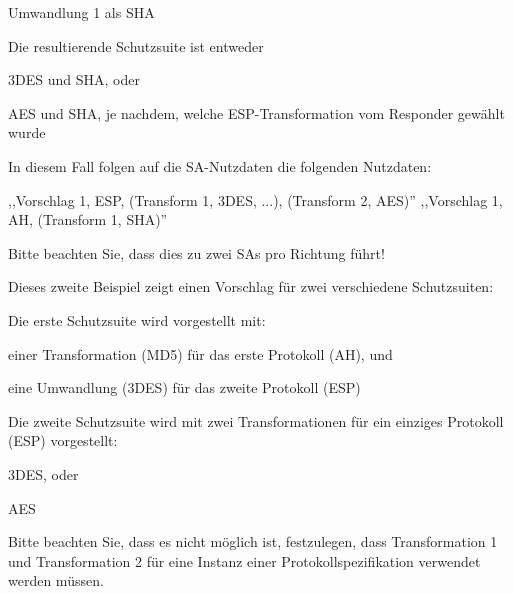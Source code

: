 \documentclass[a4paper]{article}
\begin{document}
\begin{multicols}{3}
\begin{itemize*}
\begin{itemize*}
                  \begin{itemize*}
                        \item Umwandlung 1 als SHA
                  \end{itemize*}
                  \item Die resultierende Schutzsuite ist entweder
                  \begin{itemize*}
                        \item 3DES und SHA, oder
                        \item AES und SHA, je nachdem, welche ESP-Transformation vom Responder gewählt wurde
                  \end{itemize*}
                  \item In diesem Fall folgen auf die SA-Nutzdaten die folgenden Nutzdaten:
                  \begin{itemize*}
                        \item ,,Vorschlag 1, ESP, (Transform 1, 3DES, ...), (Transform 2, AES)'' ,,Vorschlag 1, AH, (Transform 1, SHA)''
                  \end{itemize*}
                  \item Bitte beachten Sie, dass dies zu zwei SAs pro Richtung führt!
            \end{itemize*}
            \item Dieses zweite Beispiel zeigt einen Vorschlag für zwei verschiedene
            Schutzsuiten:
            \begin{itemize*}
                  \item Die erste Schutzsuite wird vorgestellt mit:
                  \begin{itemize*}
                        \item einer Transformation (MD5) für das erste Protokoll (AH), und
                        \item eine Umwandlung (3DES) für das zweite Protokoll (ESP)
                  \end{itemize*}
                  \item Die zweite Schutzsuite wird mit zwei Transformationen für ein einziges Protokoll (ESP) vorgestellt:
                  \begin{itemize*}
                        \item 3DES, oder
                        \item AES
                  \end{itemize*}
                  \item Bitte beachten Sie, dass es nicht möglich ist, festzulegen, dass Transformation 1 und Transformation 2 für eine Instanz einer Protokollspezifikation verwendet werden müssen.

\end{itemize*}
\end{itemize*}
\end{multicols}
\end{document}
